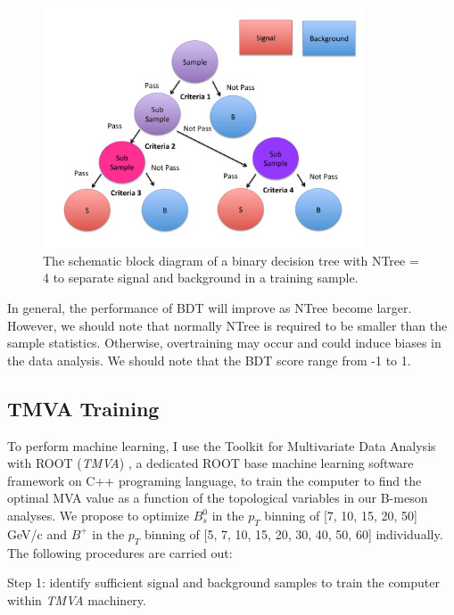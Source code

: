 \begin{figure}[h]
\begin{center}
\includegraphics[width= 0.85\textwidth]{Figures/Chapter5/DecisionTree.pdf}
\caption{The schematic block diagram of a binary decision tree with NTree = 4 to separate signal and background in a training sample.}
\label{DecisionTree}
\end{center}
\end{figure}

In general, the performance of BDT will improve as NTree become larger. However, we should note that normally NTree is required to be smaller than the sample statistics. Otherwise, overtraining may occur and could induce biases in the data analysis. We should note that the BDT score range from -1 to 1. 



\subsection{TMVA Training}


To perform machine learning, I use the Toolkit for Multivariate Data Analysis with ROOT (\textit{TMVA}) \cite{TMVA}, a dedicated ROOT base machine learning software framework on C++ programing language, to train the computer to find the optimal MVA value as a function of the topological variables in our B-meson analyses. We propose to optimize $B^0_s$ in the $p_T$ binning of [7, 10, 15, 20, 50] GeV/c and $B^+$ in the $p_T$ binning of [5, 7, 10, 15, 20, 30, 40, 50, 60] individually. The following procedures are carried out:

Step 1: identify sufficient signal and background samples to train the computer within \textit{TMVA} machinery. 

